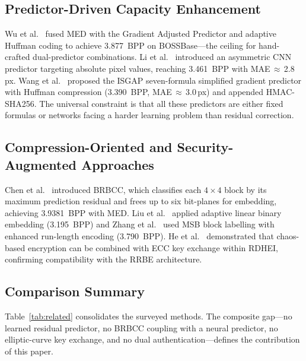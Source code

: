 \documentclass[runningheads]{llncs}
\begin{document}
\subsection{Predictor-Driven Capacity Enhancement}
Wu et al.~\cite{ref3} fused MED with the Gradient Adjusted
Predictor and adaptive Huffman coding to achieve 3.877~BPP on
BOSSBase---the ceiling for hand-crafted dual-predictor
combinations. Li et al.~\cite{ref4} introduced an asymmetric
CNN predictor targeting absolute pixel values, reaching
3.461~BPP with MAE\,$\approx$\,2.8\,px. Wang et
al.~\cite{ref5} proposed the ISGAP seven-formula simplified
gradient predictor with Huffman compression (3.390~BPP,
MAE\,$\approx$\,3.0\,px) and appended HMAC-SHA256.
The universal constraint is that all these predictors are
either fixed formulas or networks facing a harder learning
problem than residual correction.

\subsection{Compression-Oriented and Security-Augmented Approaches}
Chen et al.~\cite{ref6} introduced BRBCC, which classifies
each $4\times4$ block by its maximum prediction residual and
frees up to six bit-planes for embedding, achieving
3.9381~BPP with MED. Liu et al.~\cite{ref10} applied adaptive
linear binary embedding (3.195~BPP) and Zhang et
al.~\cite{ref11} used MSB block labelling with enhanced
run-length encoding (3.790~BPP). He et al.~\cite{ref12}
demonstrated that chaos-based encryption can be combined with
ECC key exchange within RDHEI, confirming compatibility
with the RRBE architecture.

\subsection{Comparison Summary}
Table~\ref{tab:related} consolidates the surveyed methods.
The composite gap---no learned residual predictor, no BRBCC
coupling with a neural predictor, no elliptic-curve key
exchange, and no dual authentication---defines the
contribution of this paper.
\end{document}
